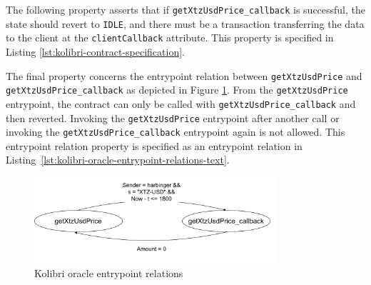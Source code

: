 \documentclass[a4paper,USenglish,cleveref, autoref, thm-restate]{lipics-v2021}
\begin{document}
The following property asserts that if \lstinline/getXtzUsdPrice_callback/ is successful, the state should revert to \lstinline/IDLE/, and there must be a transaction transferring the data to the client at the \lstinline/clientCallback/ attribute. This property is specified in Listing \ref{lst:kolibri-contract-specification}.

The final property concerns the entrypoint relation between
\lstinline/getXtzUsdPrice/ and \lstinline/getXtzUsdPrice_callback/ as
depicted in Figure \ref{fig:kolibri-oracle-emtrypoint-relations}. From
the \lstinline/getXtzUsdPrice/ entrypoint, the contract can only be
called with \lstinline/getXtzUsdPrice_callback/ and then
reverted. Invoking the \lstinline/getXtzUsdPrice/ entrypoint after
another call or invoking the \lstinline/getXtzUsdPrice_callback/
entrypoint again is not allowed. This entrypoint relation property is
specified as an entrypoint relation in
Listing~\ref{lst:kolibri-oracle-entrypoint-relations-text}. 

\begin{figure}[tp]
    \centering
    \includegraphics[width=0.8\textwidth]{kolibri}
    \caption{Kolibri oracle entrypoint relations}
    \label{fig:kolibri-oracle-emtrypoint-relations}
\end{figure}
\end{document}

